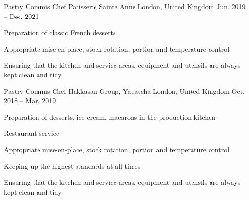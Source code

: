 

\begin{cventries}

  \cventry
    {Pastry Commis Chef} %
    {Patisserie Sainte Anne} %
    {London, United Kingdom} %
    {Jun. 2019 -- Dec. 2021} %
    {
      \begin{cvitems} %
        \item {Preparation of classic French desserts}
        \item {Appropriate mise-en-place, stock rotation, portion and temperature control}
        \item {Ensuring that the kitchen and service areas, equipment and utensils are always kept clean and tidy}
      \end{cvitems}
    }

  \cventry
    {Pastry Commis Chef} %
    {Hakkasan Group, Yauatcha} %
    {London, United Kingdom} %
    {Oct. 2018 -- Mar. 2019} %
    {
      \begin{cvitems} %
        \item {Preparation of desserts, ice cream, macarons in the production kitchen}
        \item {Restaurant service}
        \item {Appropriate mise-en-place, stock rotation, portion and temperature control}
        \vfill\null
        \columnbreak
        \item {Keeping up the highest standards at all times}
        \item {Ensuring that the kitchen and service areas, equipment and utensils are always kept clean and tidy}
      \end{cvitems}
    }


\end{cventries}
